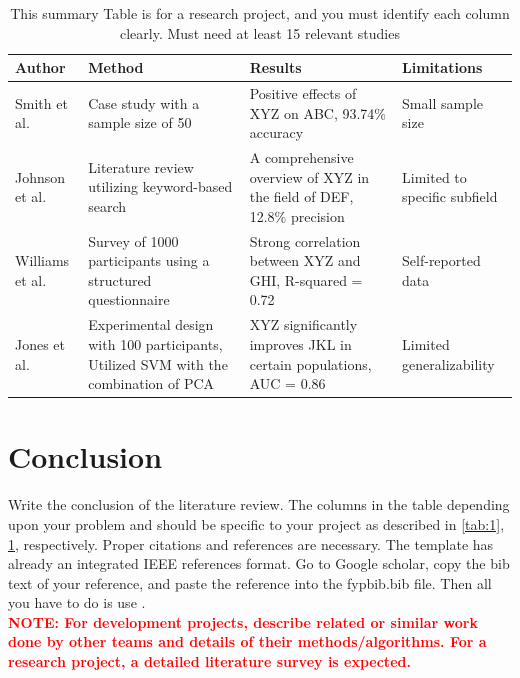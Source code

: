 \begin{table}[!h]
\caption{This summary Table is for a research project, and you must identify each column clearly. Must need at least 15 relevant studies}
\centering
\begin{tabular}{|p{3cm}|p{4cm}|p{4cm}|p{3cm}|}
\hline
\textbf{Author} & \textbf{Method} & \textbf{Results} & \textbf{Limitations} \\
\hline
Smith et al. \cite{ref:Bishop:2006}& Case study with a sample size of 50 & Positive effects of XYZ on ABC, 93.74\% accuracy & Small sample size \\
\hline
Johnson et al. \cite{ref:Duda:2000} & Literature review utilizing keyword-based search & A comprehensive overview of XYZ in the field of DEF, 12.8\% precision & Limited to specific subfield \\
\hline
Williams et al. \cite{ref:IJCNNChallenge:2007} & Survey of 1000 participants using a structured questionnaire & Strong correlation between XYZ and GHI, R-squared = 0.72 & Self-reported data \\
\hline
Jones et al. \cite{ref:SVMGuide} & Experimental design with 100 participants, Utilized SVM with the combination of PCA & XYZ significantly improves JKL in certain populations, AUC = 0.86 & Limited generalizability \\
\hline
\end{tabular}
\label{tab:2}
\end{table}

\section{Conclusion}
Write the conclusion of the literature review. 
The columns in the table depending upon your problem and should be specific to your project as described in \ref{tab:1}, \ref{tab:2}, respectively. Proper citations and references are necessary. The template has already an integrated IEEE references format. Go to Google scholar, copy the bib text of your reference, and paste the reference into the fypbib.bib file. Then all you have to do is use \cite{ref:Bishop:2006}.\\ \textcolor{red}{\textbf{NOTE: For development projects, describe related or similar work done by other teams and details of their methods/algorithms. For a research project, a detailed literature survey is expected.}}
 
